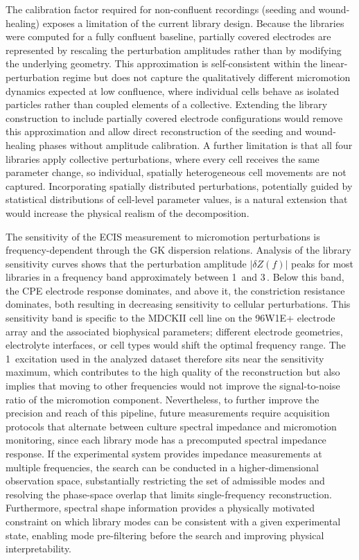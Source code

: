 \documentclass[english, 10pt, a4paper]{article}
\def\SI#1#2{#1\,#2}%
\begin{document}
The calibration factor required for non-confluent recordings (seeding and wound-healing) exposes a limitation of the current library design. Because the libraries were computed for a fully confluent baseline, partially covered electrodes are represented by rescaling the perturbation amplitudes rather than by modifying the underlying geometry. This approximation is self-consistent within the linear-perturbation regime but does not capture the qualitatively different micromotion dynamics expected at low confluence, where individual cells behave as isolated particles rather than coupled elements of a collective. Extending the library construction to include partially covered electrode configurations would remove this approximation and allow direct reconstruction of the seeding and wound-healing phases without amplitude calibration. A further limitation is that all four libraries apply collective perturbations, where every cell receives the same parameter change, so individual, spatially heterogeneous cell movements are not captured. Incorporating spatially distributed perturbations, potentially guided by statistical distributions of cell-level parameter values, is a natural extension that would increase the physical realism of the decomposition.

The sensitivity of the ECIS measurement to micromotion perturbations is frequency-dependent through the GK dispersion relations. Analysis of the library sensitivity curves shows that the perturbation amplitude $|\delta Z(f)|$ peaks for most libraries in a frequency band approximately between \SI{1}{\kilo\hertz} and \SI{3}{\kilo\hertz}. Below this band, the CPE electrode response dominates, and above it, the constriction resistance dominates, both resulting in decreasing sensitivity to cellular perturbations. This sensitivity band is specific to the MDCKII cell line on the 96W1E+ electrode array and the associated biophysical parameters; different electrode geometries, electrolyte interfaces, or cell types would shift the optimal frequency range. The \SI{1}{\kilo\hertz} excitation used in the analyzed dataset therefore sits near the sensitivity maximum, which contributes to the high quality of the reconstruction but also implies that moving to other frequencies would not improve the signal-to-noise ratio of the micromotion component. Nevertheless, to further improve the precision and reach of this pipeline, future measurements require acquisition protocols that alternate between culture spectral impedance and micromotion monitoring, since each library mode has a precomputed spectral impedance response. If the experimental system provides impedance measurements at multiple frequencies, the search can be conducted in a higher-dimensional observation space, substantially restricting the set of admissible modes and resolving the phase-space overlap that limits single-frequency reconstruction. Furthermore, spectral shape information provides a physically motivated constraint on which library modes can be consistent with a given experimental state, enabling mode pre-filtering before the search and improving physical interpretability.
\end{document}
